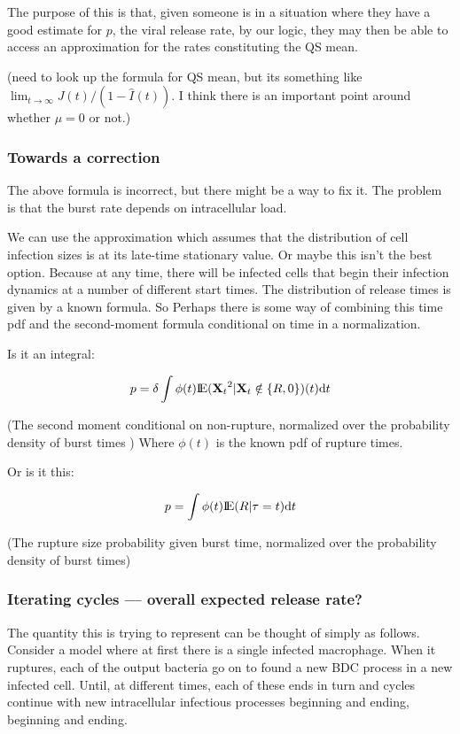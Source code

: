 \noindent
The purpose of this is that, given someone is in a situation where they have a good estimate for $p$, the viral release rate, by our logic, they may then be able to access an approximation for the rates constituting the QS mean. \par

\vspace{15pt}


\noindent
(need to look up the formula for QS mean, but its something like $\lim_{t\to\infty}{J(t) / (1-\hat I(t))}$. I think there is an important point around whether $\mu = 0$ or not.)


\subsubsection*{Towards a correction}

The above formula is incorrect, but there might be a way to fix it. The problem is that the burst rate depends on intracellular load.


We can use the approximation which assumes that the distribution of cell infection sizes is at its late-time stationary value. Or maybe this isn't the best option. Because at any time, there will be infected cells that begin their infection dynamics at a number of different start times. The distribution of release times is given by a known formula. So Perhaps there is some way of combining this time pdf and the second-moment formula conditional on time in a normalization. 

Is it an integral:

$$p =  \delta \int \phi(t) {\rm I}\!{\rm E}({{\bf X}_t}^2 | {{\bf X}_t} \notin \{R, 0 \} )(t)  {\rm d} t$$

(The second moment conditional on non-rupture, normalized over the probability density of burst times ) Where $\phi(t)$ is the known pdf of rupture times. \par
Or is it this:


$$p = \int \phi(t) {\rm I}\!{\rm E}(R | \tau = t) {\rm d} t$$

(The rupture size probability given burst time, normalized over the probability density of burst times)


\subsubsection*{Iterating cycles --- overall expected release rate?}
The quantity this is trying to represent can be thought of simply as follows. Consider a model where at first there is a single infected macrophage. When it ruptures, each of the output bacteria go on to found a new BDC process in a new infected cell. Until, at different times, each of these ends in turn and cycles continue with new intracellular infectious processes beginning and ending, beginning and ending.\par

